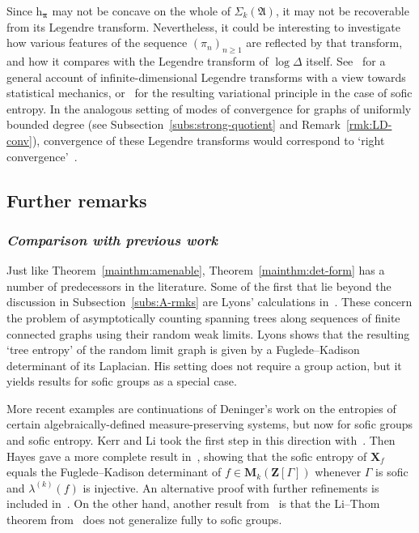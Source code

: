 \documentclass[12pt,a4paper]{article}
\numberwithin{equation}{section}
\theoremstyle{remark}
\newcommand{\bbZ}{\mathbf{Z}}
\newcommand{\rmM}{\mathbf{M}}
\newcommand{\rmh}{\mathrm{h}}
\newcommand{\A}{\mathfrak{A}}
\newcommand{\G}{\Gamma}
\renewcommand{\S}{\Sigma}
\renewcommand{\l}{\lambda}
\newcommand{\bspi}{\boldsymbol{\pi}}
\begin{document}
Since $\rmh_{\bspi}$ may not be concave on the whole of $\S_k(\A)$, it may not be recoverable from its Legendre transform.  Nevertheless, it could be interesting to investigate how various features of the sequence $(\pi_n)_{n\ge 1}$ are reflected by that transform, and how it compares with the Legendre transform of $\log \Delta$ itself. See~\cite[Sec. I.6]{SimSMLG} for a general account of infinite-dimensional Legendre transforms with a view towards statistical mechanics, or~\cite{Chung13} for the resulting variational principle in the case of sofic entropy.  In the analogous setting of modes of convergence for graphs of uniformly bounded degree (see Subsection~\ref{subs:strong-quotient} and Remark~\ref{rmk:LD-conv}), convergence of these Legendre transforms would correspond to `right convergence'~\cite{BolRio11,BorChaKahLov13}.





\subsection{Further remarks}\label{subs:C-rmks}

\subsubsection*{\emph{Comparison with previous work}}

Just like Theorem~\ref{mainthm:amenable}, Theorem~\ref{mainthm:det-form} has a number of predecessors in the literature.  Some of the first that lie beyond the discussion in Subsection~\ref{subs:A-rmks} are Lyons' calculations in~\cite{Lyons05,Lyons10}.  These concern the problem of asymptotically counting spanning trees along sequences of finite connected graphs using their random weak limits.  Lyons shows that the resulting `tree entropy' of the random limit graph is given by a Fuglede--Kadison determinant of its Laplacian.  His setting does not require a group action, but it yields results for sofic groups as a special case.

More recent examples are continuations of Deninger's work on the entropies of certain algebraically-defined measure-preserving systems, but now for sofic groups and sofic entropy.  Kerr and Li took the first step in this direction with~\cite[Thm. 7.1]{KerLi11b}.  Then Hayes gave a more complete result in~\cite{Hayes16}, showing that the sofic entropy of $\boldsymbol{X}_f$ equals the Fuglede--Kadison determinant of $f \in \rmM_k(\bbZ[\G])$ whenever $\G$ is sofic and $\l^{(k)}(f)$ is injective.  An alternative proof with further refinements is included in~\cite{Hayes21}.  On the other hand, another result from~\cite{Hayes16} is that the Li--Thom theorem from~\cite{LiTho14} does not generalize fully to sofic groups.
\end{document}
